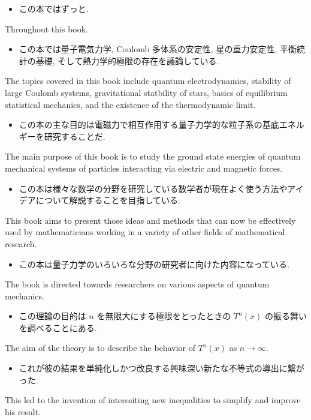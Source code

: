 \documentclass[openany, a4paper, oneside]{jsbook}
\begin{document}
\begin{itemize}
\item この本ではずっと. \cite{AltmanKleiman1}
\end{itemize}
Throughout this book.

\begin{itemize}
\item この本では量子電気力学, Coulomb 多体系の安定性, 星の重力安定性, 平衡統計の基礎, そして熱力学的極限の存在を議論している. \cite{LiebSeiringer1}
\end{itemize}
The topics covered in this book include quantum electrodynamics, stability of large Coulomb systems,
gravitational statbility of stars, basics of equilibrium statistical mechanics,
and the existence of the thermodynamic limit.

\begin{itemize}
\item この本の主な目的は電磁力で相互作用する量子力学的な粒子系の基底エネルギーを研究することだ. \cite{LiebSeiringer1}
\end{itemize}
The main purpose of this book is to study the ground state energies of quantum mechanical systems of
particles interacting via electric and magnetic forces.

\begin{itemize}
\item この本は様々な数学の分野を研究している数学者が現在よく使う方法やアイデアについて解説することを目指している. \cite{Magnetic}
\end{itemize}
This book aims to present those ideas and methods that can now be effectively used by mathematicians working in a variety of
other fields of mathematical research.

\begin{itemize}
\item この本は量子力学のいろいろな分野の研究者に向けた内容になっている. \cite{LiebSeiringer1}
\end{itemize}
The book is directed towards researchers on various aspects of quantum mechanics.

\begin{itemize}
\item この理論の目的は $n$ を無限大にする極限をとったときの $T^n(x)$ の振る舞いを調べることにある. \cite{OmriSarig1}
\end{itemize}
The aim of the theory is to describe the behavior of $T^n(x)$ as $n \to \infty$.

\begin{itemize}
\item これが彼の結果を単純化しかつ改良する興味深い新たな不等式の導出に繋がった. \cite{LiebSeiringer1}
\end{itemize}
This led to the invention of interesiting new inequalities to simplify and improve his result.
\end{document}
